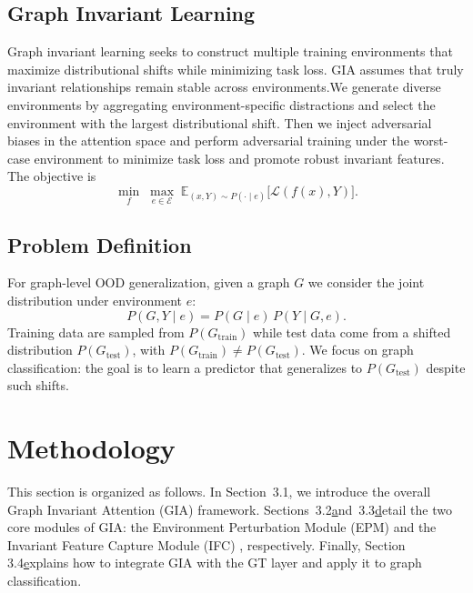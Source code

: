 \documentclass[a4paper,fleqn]{cas-dc}
\begin{document}
\subsection{Graph Invariant Learning}
Graph invariant learning seeks to construct multiple training environments that maximize distributional shifts while minimizing task loss. GIA assumes that truly invariant relationships remain stable across environments.We generate diverse environments by aggregating environment-specific distractions and select the environment with the largest distributional shift. 
Then we inject adversarial biases in the attention space and perform adversarial training under the worst-case environment to minimize task loss and promote robust invariant features. The objective is
\[
\min_f\;\max_{e\in\mathcal{E}}\; \mathbb{E}_{(x,Y)\sim P(\cdot\mid e)}\!\big[\mathcal{L}(f(x),Y)\big]. \tag{1}
\]




\subsection{Problem Definition}
For graph-level OOD generalization, given a graph $G$ we consider the joint distribution under environment $e$:
\[
P(G,Y\mid e)=P(G\mid e)\,P(Y\mid G,e). \tag{2}
\]
Training data are sampled from $P(G_{\mathrm{train}})$ while test data come from a shifted distribution $P(G_{\mathrm{test}})$, with $P(G_{\mathrm{train}})\neq P(G_{\mathrm{test}})$. We focus on graph classification: the goal is to learn a predictor that generalizes to $P(G_{\mathrm{test}})$ despite such shifts.

\section{Methodology}\label{}
This section is organized as follows. In Section  3.1\hyperref[GIA], we introduce the  overall Graph Invariant Attention (GIA) framework. Sections  3.2\hyperref[epm] and  3.3\hyperref[ifc] detail the two core modules of GIA: the Environment Perturbation Module (EPM)  and the Invariant Feature Capture Module (IFC) , respectively. Finally, Section  3.4\hyperref[gtl] explains how to integrate GIA with the GT layer and apply it to graph classification.
\end{document}
